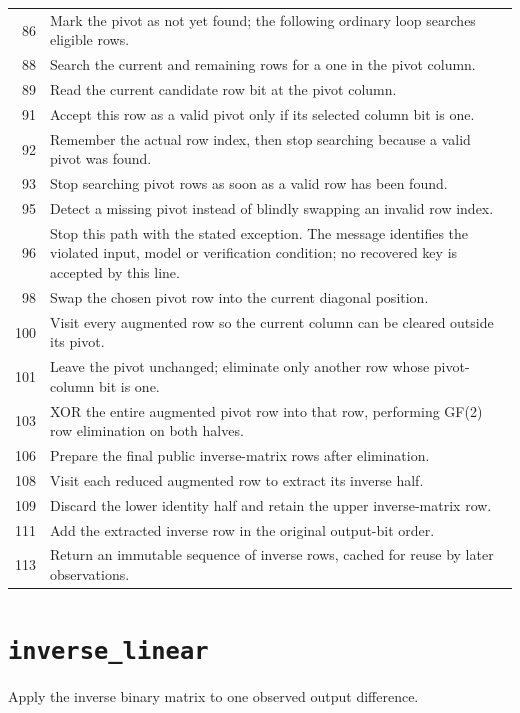 \begin{longtable}{r >{\raggedright\arraybackslash}p{138mm}}
86&Mark the pivot as not yet found; the following ordinary loop searches eligible rows.\\
88&Search the current and remaining rows for a one in the pivot column.\\
89&Read the current candidate row bit at the pivot column.\\
91&Accept this row as a valid pivot only if its selected column bit is one.\\
92&Remember the actual row index, then stop searching because a valid pivot was found.\\
93&Stop searching pivot rows as soon as a valid row has been found.\\
95&Detect a missing pivot instead of blindly swapping an invalid row index.\\
96&Stop this path with the stated exception. The message identifies the violated input, model or verification condition; no recovered key is accepted by this line.\\
98&Swap the chosen pivot row into the current diagonal position.\\
100&Visit every augmented row so the current column can be cleared outside its pivot.\\
101&Leave the pivot unchanged; eliminate only another row whose pivot-column bit is one.\\
103&XOR the entire augmented pivot row into that row, performing GF(2) row elimination on both halves.\\
106&Prepare the final public inverse-matrix rows after elimination.\\
108&Visit each reduced augmented row to extract its inverse half.\\
109&Discard the lower identity half and retain the upper inverse-matrix row.\\
111&Add the extracted inverse row in the original output-bit order.\\
113&Return an immutable sequence of inverse rows, cached for reuse by later observations.\\
\bottomrule\end{longtable}\endgroup
\section{\texttt{inverse\_linear}}
Apply the inverse binary matrix to one observed output difference.
\begin{center}\end{center}
